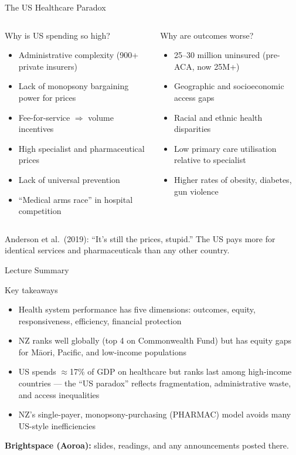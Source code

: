 \documentclass[aspectratio=169, 12pt]{beamer}
\newcommand{\summaryside}[1]{%
  \begin{frame}{Lecture Summary}
    \begin{exampleblock}{Key takeaways}
      \begin{itemize}#1\end{itemize}
    \end{exampleblock}
    \vspace{0.5em}
    {\footnotesize\textcolor{OtagoGold}{\textbf{Brightspace (Aoroa):}} slides, readings, and any announcements posted there.}
  \end{frame}}
\begin{document}
\begin{frame}{The US Healthcare Paradox}
  \begin{columns}
      \begin{block}{Why is US spending so high?}
        \begin{itemize}
          \item Administrative complexity (900+ private insurers)
          \item Lack of monopsony bargaining power for prices
          \item Fee-for-service $\Rightarrow$ volume incentives
          \item High specialist and pharmaceutical prices
          \item Lack of universal prevention
          \item ``Medical arms race'' in hospital competition
        \end{itemize}
      \end{block}
      \begin{alertblock}{Why are outcomes worse?}
        \begin{itemize}
          \item 25--30 million uninsured (pre-ACA, now 25M+)
          \item Geographic and socioeconomic access gaps
          \item Racial and ethnic health disparities
          \item Low primary care utilisation relative to specialist
          \item Higher rates of obesity, diabetes, gun violence
        \end{itemize}
      \end{alertblock}
  \end{columns}
  \vspace{0.3em}
  {\footnotesize Anderson et al.\ (2019): ``It's still the prices, stupid.'' The US pays more for identical services and pharmaceuticals than any other country.}
\end{frame}

\summaryside{
  \item Health system performance has five dimensions: outcomes, equity, responsiveness, efficiency, financial protection
  \item NZ ranks well globally (top 4 on Commonwealth Fund) but has equity gaps for Māori, Pacific, and low-income populations
  \item US spends $\approx$17\% of GDP on healthcare but ranks last among high-income countries --- the ``US paradox'' reflects fragmentation, administrative waste, and access inequalities
  \item NZ's single-payer, monopsony-purchasing (PHARMAC) model avoids many US-style inefficiencies
}
\end{document}

